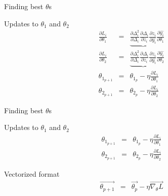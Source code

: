 \begin{frame}{Finding best $\theta$s}
\begin{block}{Updates to $\theta_1$ and $\theta_2$}
	\begin{align}
	\frac{\partial L_i}{\partial \theta_1} &=&
	\underbrace{ 
		\frac{\partial \Delta_i^2}{\partial \Delta_i}  
		\frac{\partial \Delta_i}{\partial z_i}  
		\frac{\partial z_i}{\partial \hat{y_i}} }
	\frac{\partial \hat{y_i}}{\partial \theta_1} \\
	\frac{\partial L_i}{\partial \theta_2} &=&
	\underbrace{ 
		\frac{\partial \Delta_i^2}{\partial \Delta_i}  
		\frac{\partial \Delta_i}{\partial z_i}  
		\frac{\partial z_i}{\partial \hat{y_i}} }
	\frac{\partial \hat{y_i}}{\partial \theta_2} \\
	\theta_{1_{p+1}} &=& \theta_{1_p} - \eta \frac{\partial L_i}{\partial \theta_1} \\
	\theta_{2_{p+1}} &=& \theta_{2_p} - \eta \frac{\partial L_i}{\partial \theta_2} 
	\end{align}
\end{block}
\end{frame}

\begin{frame}{Finding best $\theta$s}
\begin{block}{Updates to $\theta_1$ and $\theta_2$}
	\begin{align}
	\theta_{1_{p+1}} &=& \theta_{1_p} - \eta \frac{\partial L_i}{\partial \theta_1} \\
	\theta_{2_{p+1}} &=& \theta_{2_p} - \eta \frac{\partial L_i}{\partial \theta_2}  
	\end{align}
\end{block}
\begin{block}{Vectorized format}
	\begin{align}
	\vec{\theta_{p+1}} & = & \vec{\theta_p} - \eta \vec{\nabla_\theta L}
	\end{align}
\end{block}
\end{frame}